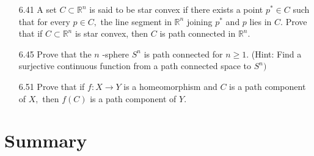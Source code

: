 \documentclass[12pt]{article}
\begin{document}
\begin{enumerate}
		\item[6.41] A set $C \subset \mathbb { R } ^ { n }$ is said to be star convex if there exists a point $p ^ { * } \in C$ such that
		for every $p \in C ,$ the line segment in $\mathbb { R } ^ { n }$ joining $p ^ { * }$ and $p$ lies in $C .$ Prove that
		if $C \subset \mathbb { R } ^ { n }$ is star convex, then $C$ is path connected in $\mathbb { R } ^ { n } .$
		
		\item[6.45] Prove that the $n$ -sphere $S ^ { n }$ is path connected for $n \geq 1 .$ (Hint: Find a surjective continuous function from a path connected space to $S ^ { n })$ 
		
		\item[6.51] Prove that if $f : X \rightarrow Y$ is a homeomorphism and $C$ is a path component of $X ,$ then $f ( C )$ is a path component of $Y .$
	
	\end{enumerate}
	\section*{Summary}
	
\end{document}
